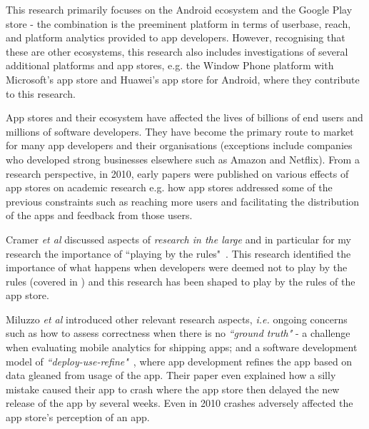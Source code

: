 This research primarily focuses on the Android ecosystem and the Google Play store - the combination is the preeminent platform in terms of userbase, reach, and platform analytics provided to app developers. However, recognising that these are other ecosystems, this research also includes investigations of several additional platforms and app stores, e.g. the Window Phone platform with Microsoft's app store and Huawei's app store for Android, where they contribute to this research. 


App stores and their ecosystem have affected the lives of billions of end users and millions of software developers. They have become the primary route to market for many app developers and their organisations (exceptions include companies who developed strong businesses elsewhere such as Amazon and Netflix). 
From a research perspective, in 2010, early papers were published on various effects of app stores on academic research e.g. how app stores addressed some of the previous constraints such as reaching more users and facilitating the distribution of the apps and feedback from those users. 

Cramer \emph{et al} discussed aspects of \emph{research in the large} and in particular for my research the importance of ``playing by the rules"~. This research identified the importance of what happens when developers were deemed not to play by the rules (covered in ) and this research has been shaped to play by the rules of the app store. %

Miluzzo \emph{et al} introduced other relevant research aspects, \textit{i.e.}  ongoing concerns such as how to assess correctness when there is no \emph{``ground truth"} - a challenge when evaluating mobile analytics for shipping apps; and a software development model of \textit{``deploy-use-refine"}~, where app development refines the app based on data gleaned from usage of the app. Their paper even explained how a silly mistake caused their app to crash where the app store then delayed the new release of the app by several weeks. Even in 2010 crashes adversely affected the app store's perception of an app. %


